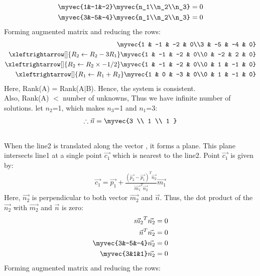 \documentclass[journal,12pt,twocolumn]{IEEEtran}
\begin{document}
\begin{align}
    \myvec{1&-1&-2}\myvec{n_1\\n_2\\n_3}=0\\
    \myvec{3&-5&-4}\myvec{n_1\\n_2\\n_3}=0
\end{align}
Forming augmented matrix and reducing the rows:
\begin{align}
\myvec{1 & -1 & -2 & 0\\3 & -5 & -4 & 0}\\
\xleftrightarrow[]{R_2\leftarrow R_2-3R_1}
\myvec{1 & -1 & -2 & 0\\0 & -2 & 2 & 0}\\
\xleftrightarrow[]{R_2\leftarrow R_2\times-1/2}
\myvec{1 & -1 & -2 & 0\\0 & 1 & -1 & 0}\\
\xleftrightarrow[]{R_1\leftarrow R_1+R_2}
\myvec{1 & 0 & -3 & 0\\0 & 1 & -1 & 0}
\end{align} 
Here, Rank(A) = Rank(A$\mid$B). Hence, the system is consistent. 
\\
Also, Rank(A) $<$ number of unknowns, Thus we have infinite number of solutions. let $n_2$=1, which makes $n_3$=1 and $n_1$=3:
\begin{align}
    \therefore \vec{n}=\myvec{3 \\ 1 \\ 1 }
\end{align}
\\
When the line2 is translated along the vector , it forms a plane. This plane intersects line1 at a single point $\vec{c_1}$ which is nearest to the line2. Point $\vec{c_1}$ is given by:
\\
\begin{align}
\vec{c_1}=\vec{p_1}+\frac{(\vec{p_2}-\vec{p_1})^T \vec{n_2}}{\vec{m_1}^T \vec{n_2}}\vec{m_1} 
\end{align}
Here, $\Vec{n_2}$ is perpendicular to both vector $\Vec{m_2}$ and $\Vec{n}$. Thus, the dot product of the $\Vec{n_2}$ with $\Vec{m_2}$ and $\Vec{n}$ is zero:
\begin{align}
    \vec{m_2}^T\vec{n_2} =  0\\
    \vec{n}^T\vec{n_2} =  0\\
    \myvec{3&-5&-4}\vec{n_2}=0\\
    \myvec{3&1&1}\vec{n_2}=0
\end{align}
Forming augmented matrix and reducing the rows:
\end{document}
